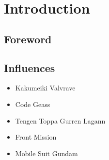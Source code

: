 \section{Introduction}

\subsection{Foreword}

\subsection{Influences}
\begin{itemize}
\item Kakumeiki Valvrave
\item Code Geass
\item Tengen Toppa Gurren Lagann
\item Front Mission
\item Mobile Suit Gundam
\end{itemize}